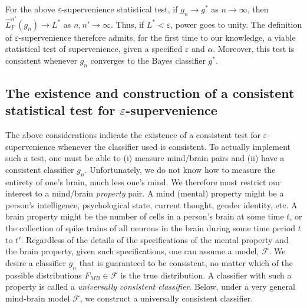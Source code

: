 \documentclass{article}
\newcommand{\conv}{\rightarrow}
\newcommand{\eps}{\varepsilon}
\providecommand{\mc}[1]{\mathcal{#1}}
\providecommand{\mh}[1]{\widehat{#1}}
\newcommand{\hL}{\widehat{L}}
\begin{document}
 For the above $\eps$-supervenience statistical test, if $g_n \conv g^*$ as $n \conv \infty$, then $\hL^{n'}_F(g_n) \conv L^*$ as $n,n' \conv \infty$.  Thus, if $L^* < \eps$, 
power goes to unity.
The definition of $\eps$-supervenience therefore admits, for the first time to our knowledge, a viable statistical test of supervenience, given a specified $\eps$ and $\alpha$. Moreover, this test is consistent whenever $g_n$ converges to the Bayes classifier $g^*$.





\subsection*{The existence and construction of a consistent statistical test for $\eps$-supervenience} %
\label{sub:uc}

The above considerations indicate the existence of a consistent test for $\eps$-supervenience whenever the classifier used is consistent.  
To actually implement such a test, one must be able to (i) measure mind/brain pairs and (ii) have a consistent classifier $g_n$.  Unfortunately, we do not know how to measure the entirety of one's brain, much less one's mind. 
We therefore must restrict our interest to a mind/brain \emph{property} pair.  
A mind (mental) property might be a person's intelligence, psychological state, current thought, gender identity, etc.  A brain property might be the number of cells in a person's brain at some time $t$, or the collection of spike trains of all neurons in the brain during some time period $t$ to $t'$.  Regardless of the details of the specifications of the mental property and the brain property, given such specifications, one can assume a model, $\mc{F}$.  We desire a classifier $g_n$ that is guaranteed to be consistent, no matter which of the possible distributions $F_{MB} \in \mc{F}$ is the true distribution.  A classifier with such a property is called a \emph{universally consistent classifier}.  
Below, under a very general mind-brain model $\mc{F}$, we construct a universally consistent classifier. 
\end{document}
